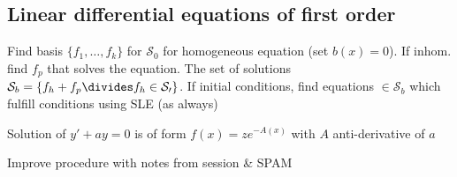 \newsectionNoPB
\subsection{Linear differential equations of first order}
  Find basis $\{ f_1, \ldots, f_k \}$ for $\mathcal{S}_0$ for homogeneous equation (set $b(x) = 0$).
 If inhom. find $f_p$ that solves the equation. The set of solutions $\mathcal{S}_b = \{ f_h + f_p \divides f_h \in \mathcal{S_0} \}$.
 If initial conditions, find equations $\in \mathcal{S}_b$ which fulfill conditions using SLE (as always)

\shortproposition Solution of $y' + ay = 0$ is of form $f(x) = z e^{-A(x)}$ with $A$ anti-derivative of $a$

\TODO Improve procedure with notes from session \& SPAM
